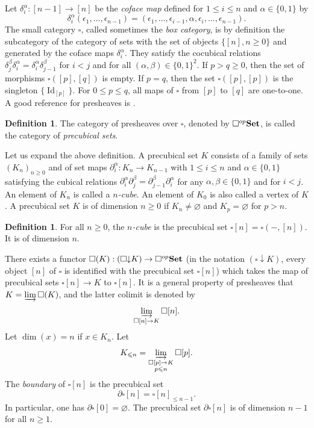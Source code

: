 \documentclass[a4paper,12pt]{amsart}
\newcommand{\de}{\partial}
\newcommand{\p}{\times}
\theoremstyle{definition}
\newtheorem{defn}[thm]{Definition}
\newcommand{\bd}{\begin{defn}}
\newcommand{\ed}{\end{defn}}
\renewcommand{\leq}{\leqslant}
\renewcommand{\geq}{\geqslant}
\newcommand{\brm}[1]{{\rm{\mathbf{#1}}}}
\newcommand{\set}{{\brm{Set}}}
\DeclareMathOperator{\id}{Id}
\newcommand{\liminj}{\varinjlim}
\newcommand{\ddownarrow}{{\downarrow}}
\begin{document}
Let $\delta_i^\alpha : [n-1] \rightarrow [n]$ be the \textit{coface map} defined for $1\leq i\leq n$ and $\alpha \in \{0,1\}$ by \[\delta_i^\alpha(\epsilon_1, \dots, \epsilon_{n-1}) = (\epsilon_1,\dots, \epsilon_{i-1}, \alpha, \epsilon_i, \dots, \epsilon_{n-1}).\] The small category $\square$, called sometimes the \textit{box category},  is by definition the subcategory of the category of sets with the set of objects $\{[n],n\geq 0\}$ and generated by the coface maps $\delta_i^\alpha$. They satisfy the cocubical relations $\delta_j^\beta \delta_i^\alpha = \delta_i^\alpha \delta_{j-1}^\beta $ for $i<j$ and for all $(\alpha,\beta)\in \{0,1\}^2$. If $p>q\geq 0$, then the set of morphisms $\square([p],[q])$ is empty. If $p = q$, then the set $\square([p],[p])$ is the singleton $\{\id_{[p]}\}$. For $0\leq p \leq q$, all maps of $\square$ from $[p]$ to $[q]$ are one-to-one. A good reference for presheaves is \cite{MR1300636}. 

\bd \cite{Brown_cube} The category of presheaves over $\square$, denoted by $\square^{op}\set$, is called the category of \textit{precubical sets}. 
\ed 

Let us expand the above definition. A precubical set $K$ consists of a family of sets $(K_n)_{n \geq 0}$ and of set maps $\de_i^\alpha:K_n \rightarrow K_{n-1}$ with $1\leq i \leq n$ and $\alpha\in\{0,1\}$ satisfying the cubical relations $\de_i^\alpha\de_j^\beta = \de_{j-1}^\beta \de_i^\alpha$ for any $\alpha,\beta\in \{0,1\}$ and for $i<j$. An element of $K_n$ is called a \textit{$n$-cube}. An element of $K_0$ is also called a vertex of $K$. A precubical set $K$ is of dimension $n\geq 0$ if $K_n\neq \varnothing$ and $K_p=\varnothing$ for $p>n$. 

\bd
	For all $n\geq 0$, the \textit{$n$-cube} is the precubical set $\square[n]=\square(-,[n])$. It is of dimension $n$.
\ed

There exists a functor $\square(K):(\square\ddownarrow K) \to \square^{op}\set$ (in the notation $(\square\ddownarrow K)$, every object $[n]$ of $\square$ is identified with the precubical set $\square[n]$) which takes the map of precubical sets $\square[n]\to K$ to $\square[n]$. It is a general property of presheaves that $K = \liminj \square(K)$, and the latter colimit is denoted by \[\liminj_{\square[n]\rightarrow K} \square[n].\] Let $\dim(x)=n$ if $x\in K_n$. Let \[K_{\leq n} = \liminj_{\substack{\square[p]\to K\\p\leq n}} \square[p].\] The \textit{boundary} of $\square[n]$ is the precubical set \[\de \square[n] = \square[n]_{\leq n-1}.\] In particular, one has $\de \square[0] = \varnothing$. The precubical set $\de \square[n]$ is of dimension $n-1$ for all $n\geq 1$.
\end{document}
